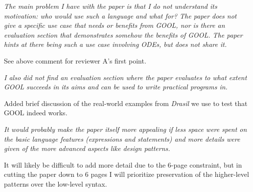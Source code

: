 \documentclass[12pt]{article}
\begin{document}
\textit{The main problem I have with the paper is that I do not understand its 
motivation: who
would use such a language and what for? The paper does not give a specific use 
case
that needs or benefits from GOOL, nor is there an evaluation section that 
demonstrates
somehow the benefits of GOOL. The paper hints at there being such a use case 
involving
ODEs, but does not share it.}

See above comment for reviewer A's first point.

\textit{I also did not find an evaluation section where the paper evaluates to 
what extent
	GOOL succeeds in its aims and can be used to write practical programs in.}

Added brief discussion of the real-world examples from \textit{Drasil} we use 
to test that GOOL indeed works.

\textit{It would probably make the paper itself more appealing if less space 
were spent on the basic
	language features (expressions and statements) and more details were given 
	of the more advanced aspects like design patterns.}

It will likely be difficult to add more detail due to the 6-page constraint, 
but in cutting the paper down to 6 pages I will prioritize preservation of the 
higher-level patterns over the low-level syntax.
\end{document}
